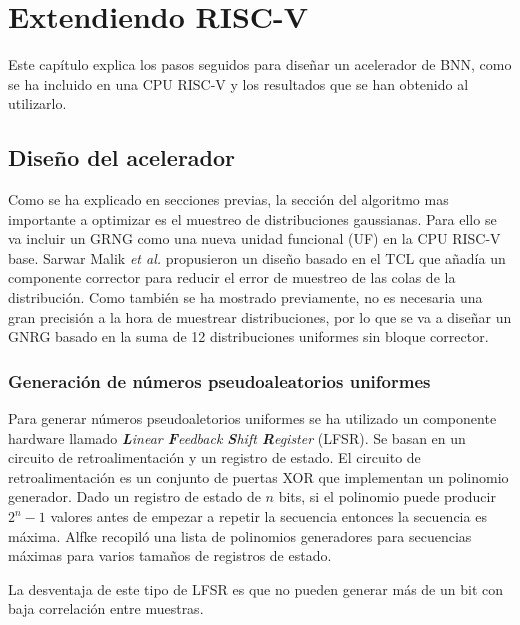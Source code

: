 \chapter{Extendiendo RISC-V}

Este capítulo explica los pasos seguidos para diseñar un acelerador de BNN, como se ha incluido en una CPU RISC-V y los resultados que se han obtenido al utilizarlo.

\section{Diseño del acelerador}

Como se ha explicado en secciones previas, la sección del algoritmo mas importante a optimizar es el muestreo de distribuciones gaussianas. Para ello se va incluir un GRNG como una nueva unidad funcional (UF) en la CPU RISC-V base. Sarwar Malik \emph{et al.} \cite{clt_grng} propusieron un diseño basado en el TCL que añadía un componente corrector para reducir el error de muestreo de las colas de la distribución. Como también se ha mostrado previamente, no es necesaria una gran precisión a la hora de muestrear distribuciones, por lo que se va a diseñar un GNRG basado en la suma de 12 distribuciones uniformes sin bloque corrector.

\subsection{Generación de números pseudoaleatorios uniformes}

Para generar números pseudoaletorios uniformes se ha utilizado un componente hardware llamado \textit{\textbf{L}inear \textbf{F}eedback \textbf{S}hift \textbf{R}egister} (LFSR). Se basan en un circuito de retroalimentación y un registro de estado. El circuito de retroalimentación es un conjunto de puertas XOR que implementan un polinomio generador. Dado un registro de estado de $n$ bits, si el polinomio puede producir $2^n-1$ valores antes de empezar a repetir la secuencia entonces la secuencia es máxima. Alfke \cite{lfsr_poly} recopiló una lista de polinomios generadores para secuencias máximas para varios tamaños de registros de estado.

La desventaja de este tipo de LFSR es que no pueden generar más de un bit con baja correlación entre muestras.


